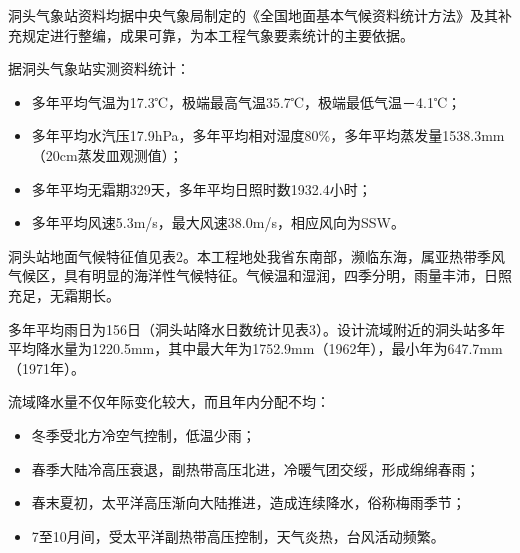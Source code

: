 \documentclass[UTF8, a4paper, 12pt]{ctexart} %
\begin{document}
洞头气象站资料均据中央气象局制定的《全国地面基本气候资料统计方法》及其补充规定进行整编，成果可靠，为本工程气象要素统计的主要依据。

据洞头气象站实测资料统计：
\begin{itemize}
    \item 多年平均气温为17.3℃，极端最高气温35.7℃，极端最低气温－4.1℃；
    \item 多年平均水汽压17.9hPa，多年平均相对湿度80\%，多年平均蒸发量1538.3mm（20cm蒸发皿观测值）；
    \item 多年平均无霜期329天，多年平均日照时数1932.4小时；
    \item 多年平均风速5.3m/s，最大风速38.0m/s，相应风向为SSW。
\end{itemize}

洞头站地面气候特征值见表2。本工程地处我省东南部，濒临东海，属亚热带季风气候区，具有明显的海洋性气候特征。气候温和湿润，四季分明，雨量丰沛，日照充足，无霜期长。

多年平均雨日为156日（洞头站降水日数统计见表3）。设计流域附近的洞头站多年平均降水量为1220.5mm，其中最大年为1752.9mm（1962年），最小年为647.7mm（1971年）。

流域降水量不仅年际变化较大，而且年内分配不均：
\begin{itemize}
    \item 冬季受北方冷空气控制，低温少雨；
    \item 春季大陆冷高压衰退，副热带高压北进，冷暖气团交绥，形成绵绵春雨；
    \item 春末夏初，太平洋高压渐向大陆推进，造成连续降水，俗称梅雨季节；
    \item 7至10月间，受太平洋副热带高压控制，天气炎热，台风活动频繁。
\end{itemize}
\end{document}
